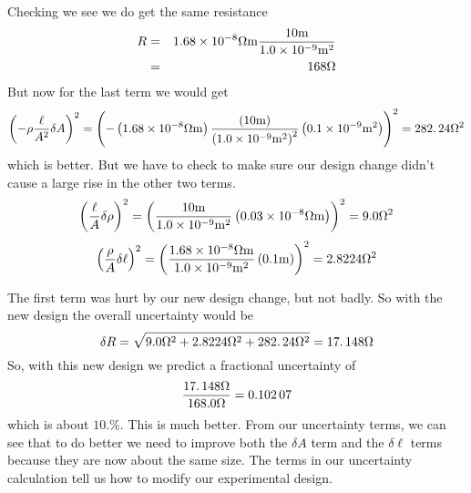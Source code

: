 Checking we see we do get the same resistance 
\begin{eqnarray*}
R &=&1.68\times 10^{-8}\unit{%
\Omega%
}\unit{m}\frac{10\unit{m}}{1.0\times 10^{-9}\unit{m}^{2}} \\
&=&168\unit{%
\Omega%
}
\end{eqnarray*}%
But now for the last term we would get 
\begin{equation*}
\left( -\rho \frac{\ell }{A^{2}}\delta A\right) ^{2}=\left( -\left(
1.68\times 10^{-8}\unit{%
\Omega%
}\unit{m}\right) \frac{\left( 10\unit{m}\right) }{\left( 1.0\times 10^{-9}%
\unit{m}^{2}\right) ^{2}}\left( 0.1\times 10^{-9}\unit{m}^{2}\right) \right)
^{2}=282.\,\allowbreak 24\unit{%
\Omega%
}^{2}
\end{equation*}%
which is better. But we have to check to make sure our design change didn't
cause a large rise in the other two terms. 
\begin{equation*}
\left( \frac{\ell }{A}\delta \rho \right) ^{2}=\left( \frac{10\unit{m}}{%
1.0\times 10^{-9}\unit{m}^{2}}\left( 0.03\times 10^{-8}\unit{%
\Omega%
}\unit{m}\right) \right) ^{2}=9.0\unit{%
\Omega%
}^{2}
\end{equation*}%
\begin{equation*}
\left( \frac{\rho }{A}\delta \ell \right) ^{2}=\left( \frac{1.68\times
10^{-8}\unit{%
\Omega%
}\unit{m}}{1.0\times 10^{-9}\unit{m}^{2}}\left( 0.1\unit{m}\right) \right)
^{2}=2.8224\unit{%
\Omega%
}^{2}
\end{equation*}

The first term was hurt by our new design change, but not badly. So with the
new design the overall uncertainty would be 
\begin{equation*}
\delta R=\sqrt{9.0\unit{%
\Omega%
}^{2}+2.8224\unit{%
\Omega%
}^{2}+282.\,\allowbreak 24\unit{%
\Omega%
}^{2}}=17.\,\allowbreak 148\unit{%
\Omega%
}
\end{equation*}%
$\allowbreak $So, with this new design we predict a fractional uncertainty of%
\begin{equation*}
\frac{17.\,\allowbreak 148\unit{%
\Omega%
}}{168.0\unit{%
\Omega%
}}=0.102\,07
\end{equation*}%
which is about $\allowbreak 10.\%.$ This is much better. From our
uncertainty terms, we can see that to do better we need to improve both the $%
\delta A$ term and the $\delta \ell $ terms because they are now about the
same size. The terms in our uncertainty calculation tell us how to modify
our experimental design.

